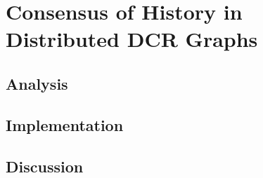 \chapter{Consensus of History in Distributed DCR Graphs}
\label{chap:consensusindcr}
	\section{Analysis} %
	\section{Implementation} %
	\section{Discussion} %